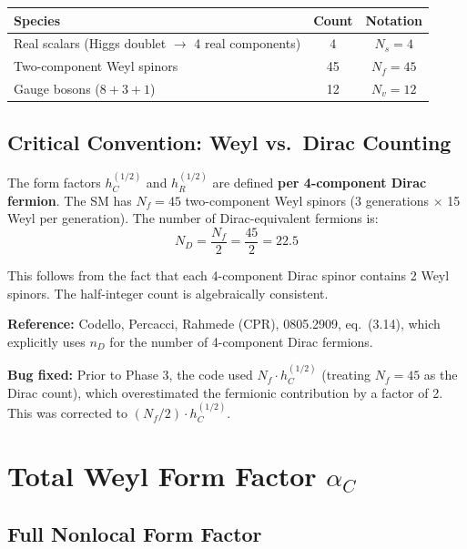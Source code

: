 \documentclass[11pt,a4paper]{article}
\begin{document}
\begin{center}
\renewcommand{\arraystretch}{1.3}
\begin{tabular}{lcc}
  \toprule
  \textbf{Species} & \textbf{Count} & \textbf{Notation} \\
  \midrule
  Real scalars (Higgs doublet $\to$ 4 real components) & 4 & $N_s = 4$ \\
  Two-component Weyl spinors & 45 & $N_f = 45$ \\
  Gauge bosons ($8 + 3 + 1$) & 12 & $N_v = 12$ \\
  \bottomrule
\end{tabular}
\end{center}

\subsection{Critical Convention: Weyl vs.\ Dirac Counting}

The form factors $h_C^{(1/2)}$ and $h_R^{(1/2)}$ are defined \textbf{per
4-component Dirac fermion}. The SM has $N_f = 45$ two-component Weyl spinors
(3 generations $\times$ 15 Weyl per generation). The number of Dirac-equivalent
fermions is:
\begin{equation}
  \boxed{N_D = \frac{N_f}{2} = \frac{45}{2} = 22.5}
  \label{eq:ND}
\end{equation}

This follows from the fact that each 4-component Dirac spinor contains 2 Weyl
spinors. The half-integer count is algebraically consistent.

\textbf{Reference:} Codello, Percacci, Rahmede (CPR), 0805.2909, eq.~(3.14),
which explicitly uses $n_D$ for the number of 4-component Dirac fermions.

\textbf{Bug fixed:} Prior to Phase 3, the code used $N_f \cdot h_C^{(1/2)}$
(treating $N_f=45$ as the Dirac count), which overestimated the fermionic
contribution by a factor of 2. This was corrected to $(N_f/2) \cdot h_C^{(1/2)}$.

\section{Total Weyl Form Factor $\alpha_C$}

\subsection{Full Nonlocal Form Factor}
\end{document}
